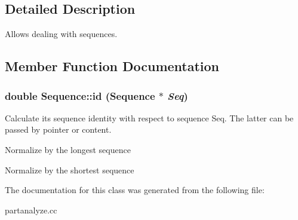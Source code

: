 \subsection{Detailed Description}
Allows dealing with sequences. 



\subsection{Member Function Documentation}
\subsubsection{\setlength{\rightskip}{0pt plus 5cm}double Sequence::id ({\bf Sequence} $\ast$ {\em Seq})}\label{classSequence_a4}


Calculate its sequence identity with respect to sequence Seq. The latter can be passed by pointer or content. 

Normalize by the longest sequence

Normalize by the shortest sequence 

The documentation for this class was generated from the following file:\begin{CompactItemize}
\item 
partanalyze.cc\end{CompactItemize}
